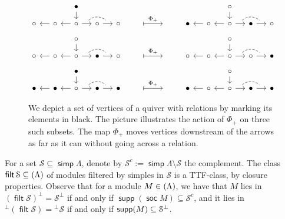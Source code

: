 \documentclass[a4paper,11pt]{amsart}
\theoremstyle{plain}
\theoremstyle{definition}
\newcommand{\Scal}{\mathcal{S}} \newcommand{\Tcal}{\mathcal{T}} \newcommand{\Ucal}{\mathcal{U}}
\DeclareMathOperator{\simp}{\mathsf{simp}}
\DeclareMathOperator{\soc}{\mathsf{soc}}
\let\top\relax
\DeclareMathOperator{\top}{\mathsf{top}}
\DeclareMathOperator{\filt}{\mathsf{filt}}
\let\mod\relax
\DeclareMathOperator{\mod}{\mathsf{mod}}
\DeclareMathOperator{\supp}{\mathsf{supp}}
\begin{document}
\begin{figure}[t]
	\[\begin{tikzcd}[sep=small]
		& & \bullet \ar{d} & & & & & & & & \circ \ar{d} \\
		\circ & \ar{l} \circ & \ar{l} \circ \ar[""{name=S, above}]{r} &
			\circ \ar[""{name=E,above}]{r} & \circ
		\ar[-,dashed,from=S,to=E,bend left=4em]
		& \; \ar[|->]{rr}{\Phi_+} && \; &
		\bullet & \ar{l} \circ & \ar{l} \circ \ar[""{name=S, above}]{r} &
			\bullet \ar[""{name=E,above}]{r} & \circ
		\ar[-,dashed,from=S,to=E,bend left=4em]
	\end{tikzcd}
	\]
	\[\begin{tikzcd}[sep=small]
		& & \circ \ar{d} & & & & & & & & \circ \ar{d} \\
		\circ & \ar{l} \circ & \ar{l} \circ \ar[""{name=S, above}]{r} &
			\bullet \ar[""{name=E,above}]{r} & \circ
		\ar[-,dashed,from=S,to=E,bend left=4em]
		& \; \ar[|->]{rr}{\Phi_+} && \; &
		\circ & \ar{l} \circ & \ar{l} \circ \ar[""{name=S, above}]{r} &
			\circ \ar[""{name=E,above}]{r} & \bullet
		\ar[-,dashed,from=S,to=E,bend left=4em]
	\end{tikzcd}
	\]
	\[
	\begin{tikzcd}[sep=small]
		& & \bullet \ar{d} & & & & & & & & \circ \ar{d} \\
		\bullet & \ar{l} \bullet & \ar{l} \circ \ar[""{name=S, above}]{r} &
			\bullet \ar[""{name=E,above}]{r} & \bullet
		\ar[-,dashed,from=S,to=E,bend left=4em]
		& \; \ar[|->]{rr}{\Phi_+} && \; &
		\bullet & \ar{l} \circ & \ar{l} \circ \ar[""{name=S, above}]{r} &
			\bullet \ar[""{name=E,above}]{r} & \bullet
		\ar[-,dashed,from=S,to=E,bend left=4em]
	\end{tikzcd}
	\]
	\caption{
		We depict a set of vertices of a quiver with relations by marking its
		elements in black. The picture illustrates the action of $\Phi_+$ on three such
		subsets. The map $\Phi_+$ moves vertices downstream of the arrows as far as
		it can without going across a relation.
	}\label{fig:phi+}
\end{figure}

For a set $\Scal\subseteq\simp\Lambda$, denote by
$\Scal^c:=\simp\Lambda\setminus\Scal$ the complement. The class
$\filt\Scal\subseteq\mod(\Lambda)$ of
modules filtered by simples in $\Scal$ is a TTF-class, by closure properties.
Observe that for a module $M\in\mod(\Lambda)$, we have that $M$ lies in
$(\filt\Scal)^\bot=\Scal^\bot$ if and only if $\supp(\soc M)\subseteq\Scal^c$,
and it lies in ${}^\bot(\filt\Scal)={}^\bot\Scal$ if and only if $\supp(\top
M)\subseteq\Scal^\bot$.
\end{document}
